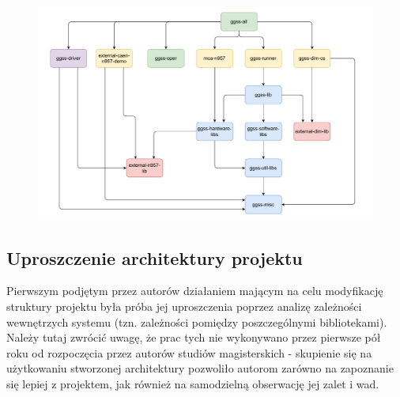 \begin{landscape}

\begin{figure}[H]
\centering
\includegraphics[width=1.4\textwidth]{components/infra_images/old_structure.pdf}
\caption{}
\label{fig:old_structure}
\end{figure}

\end{landscape}

\subsection{Uproszczenie architektury projektu}
Pierwszym podjętym przez autorów działaniem mającym na celu modyfikację struktury projektu była próba jej uproszczenia poprzez analizę zależności wewnętrzych systemu (tzn. zależności pomiędzy poszczególnymi bibliotekami). Należy tutaj zwrócić uwagę, że prac tych nie wykonywano przez pierwsze pół roku od rozpoczęcia przez autorów studiów magisterskich - skupienie się na użytkowaniu stworzonej architektury pozwoliło autorom zarówno na zapoznanie się lepiej z projektem, jak również na samodzielną obserwację jej zalet i wad. 

